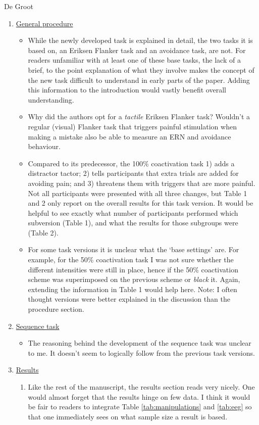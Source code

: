 \documentclass[twocolumn, serif, authordate, review]{jote-article}
\begin{document}
\begin{paracol}{2}
\begin{reviewend}{De Groot}
\begin{enumerate}[label=\textbf{\arabic*}), start=0]
    \item \hyperref[sec:procedure]{General procedure}
        \begin{itemize}
            \item While the newly developed task is explained in detail, the two tasks it is based on, an Eriksen Flanker task and an avoidance task, are not. For readers unfamiliar with at least one of these base tasks, the lack of a brief, to the point explanation of what they involve makes the concept of the new task difficult to understand in early parts of the paper. Adding this information to the introduction would vastly benefit overall understanding. 
            \item Why did the authors opt for a \textit{tactile} Eriksen Flanker task? Wouldn't a regular (visual) Flanker task that triggers painful stimulation when making a mistake also be able to measure an ERN and avoidance behaviour. 
            \item Compared to its predecessor, the 100\% coactivation task 1) adds a distractor tactor; 2) tells participants that extra trials are added for avoiding pain; and 3) threatens them with triggers that are more painful. Not all participants were presented with all three changes, but Table 1 and 2 only report on the overall results for this task version. It would be helpful to see exactly what number of participants performed which subversion (Table 1), and what the results for those subgroups were (Table 2).
            \item For some task versions it is unclear what the `base settings' are. For example, for the 50\% coactivation task I was not sure whether the different intensities were still in place, hence if the 50\% coactivation scheme was superimposed on the previous scheme or \textit{black} it. Again, extending the information in Table 1 would help here. Note: I often thought versions were better explained in the discussion than the procedure section.
        \end{itemize}
    
    \item \hyperref[sec:sequence]{Sequence task}
        \begin{itemize}
            \item The reasoning behind the development of the sequence task was unclear to me. It doesn't seem to logically follow from the previous task versions.
        \end{itemize}
        
    \item \hyperref[sec:results]{Results}
        \begin{enumerate}
            \item Like the rest of the manuscript, the results section reads very nicely. One would almost forget that the results hinge on few data. I think it would be fair to readers to integrate Table \ref{tab:manipulations} and \ref{tab:eeg} so that one immediately sees on what sample size a result is based.
        \end{enumerate}
        

\end{enumerate}
\end{reviewend}
\end{paracol}
\end{document}
